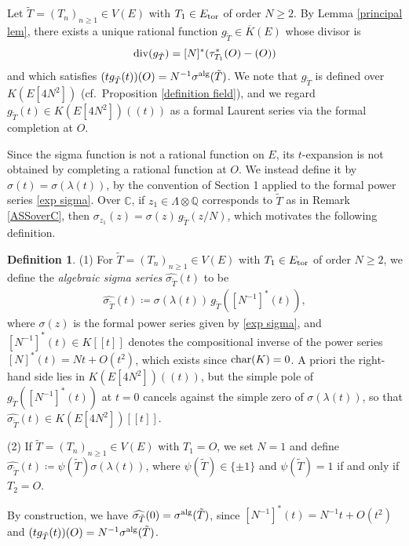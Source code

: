 \documentclass[11pt]{amsart}
\theoremstyle{definition}
\newtheorem{dfn}[thm]{Definition}
\begin{document}
Let $\tilde{T}=(T_n)_{n \geq 1} \in V(E)$ with $T_1 \in E_{\rm tor}$ of
order $N \geq 2$. By Lemma \ref{principal lem}, there exists a unique
rational function $g_{\tilde{T}} \in \overline{K}(E)$ whose divisor is
\[{\rm div}(g_{\tilde{T}})=[N]^{\ast}(\tau_{T_1}^{\ast} (O)-(O))\] and which
satisfies $(tg_{\tilde{T}}(t))(O)=N^{-1}\sigma^{\rm alg}(\tilde{T})$.
We note that $g_{\tilde{T}}$ is defined over $K(E[4N^2])$
(cf.\ Proposition \ref{definition field}), and we regard
$g_{\tilde{T}}(t) \in K(E[4N^2])((t))$ as a formal Laurent series via the
formal completion at $O$.

Since the sigma function is not a rational function on $E$, 
its \(t\)-expansion is not obtained by completing a rational function at \(O\). We instead define it by
$\hat{\sigma}(t)=\sigma(\lambda(t))$, by the convention of Section 1
applied to the formal power series \eqref{exp sigma}.
Over $\mathbb{C}$, if $z_1 \in \Lambda \otimes \mathbb{Q}$ corresponds to
$\tilde{T}$ as in Remark \ref{ASSoverC}, then
$\sigma_{z_1}(z)=\sigma(z)\,g_{\tilde{T}}(z/N)$, which motivates the
following definition.

\begin{dfn}\label{def ASS}
(1) For $\tilde{T}=(T_n)_{n \geq 1} \in V(E)$ with $T_1 \in E_{\rm tor}$ of
order $N \geq 2$, we define the {\it algebraic sigma series}
$\widehat{\sigma_{\tilde{T}}}(t)$ to be
%
\begin{align*}
\widehat{\sigma_{\tilde{T}}}(t) \coloneqq \sigma(\lambda(t))\,
g_{\tilde{T}}([N^{-1}]^{\ast}(t)),
\end{align*}
%
where $\sigma(z)$ is the formal power series given by \eqref{exp sigma},
and $[N^{-1}]^{\ast}(t) \in K[[t]]$ denotes the compositional inverse of
the power series $[N]^{\ast}(t)=Nt+O(t^2)$, which exists since
${\rm char}(K)=0$.
A priori the right-hand side lies in $K(E[4N^2])((t))$, but the simple pole
of $g_{\tilde{T}}([N^{-1}]^{\ast}(t))$ at $t=0$ cancels against the simple
zero of $\sigma(\lambda(t))$, so that
$\widehat{\sigma_{\tilde{T}}}(t) \in K(E[4N^2])[[t]]$.

(2) If $\tilde{T}=(T_n)_{n \geq 1} \in V(E)$ with $T_1=O$, we set $N=1$ and
define $\widehat{\sigma_{\tilde{T}}}(t) \coloneqq \psi(\tilde{T})
\sigma(\lambda(t))$, where $\psi(\tilde{T}) \in \{\pm 1\}$ and
$\psi(\tilde{T})=1$ if and only if $T_2=O$.
\end{dfn}

By construction, we have
$\widehat{\sigma_{\tilde{T}}}(0)=\sigma^{\rm alg}(\tilde{T})$, since
$[N^{-1}]^{\ast}(t)=N^{-1}t+O(t^2)$ and
$(tg_{\tilde{T}}(t))(O)=N^{-1}\sigma^{\rm alg}(\tilde{T})$.
\end{document}
